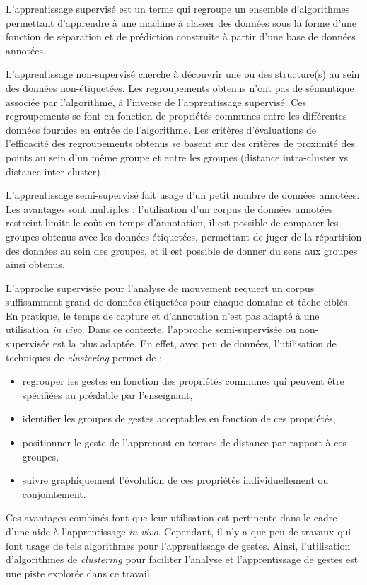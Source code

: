 L'apprentissage supervisé est un terme qui regroupe un ensemble d'algorithmes permettant d'apprendre à une machine à classer des données sous la forme d'une fonction de séparation et de prédiction construite à partir d'une base de données annotées.

L'apprentissage non-supervisé cherche à découvrir une ou des structure(s) au sein des données non-étiquetées. Les regroupements obtenus n'ont pas de sémantique associée par l'algorithme, à l'inverse de l'apprentissage supervisé. Ces regroupements se font en fonction de propriétés communes entre les différentes données fournies en entrée de l'algorithme. Les critères d'évaluations de l'efficacité des regroupements obtenus se basent sur des critères de proximité des points au sein d'un même groupe et entre les groupes (distance intra-cluster vs distance inter-cluster) \parencite{Kassab2008Fbc}.

L'apprentissage semi-supervisé fait usage d'un petit nombre de données annotées. Les avantages sont multiples : l'utilisation d'un corpus de données annotées restreint limite le coût en temps d'annotation, il est possible de comparer les groupes obtenus avec les données étiquetées, permettant de juger de la répartition des données au sein des groupes, et il est possible de donner du sens aux groupes ainsi obtenus.

L'approche supervisée pour l'analyse de mouvement requiert un corpus suffisamment grand de données étiquetées pour chaque domaine et tâche ciblés. En pratique, le temps de capture et d'annotation n'est pas adapté à une utilisation \textit{in vivo}. Dans ce contexte, l'approche semi-supervisée ou non-supervisée est la plus adaptée. En effet, avec peu de données, l'utilisation de techniques de \textit{clustering} permet de :

\begin{itemize}
	\item regrouper les gestes en fonction des propriétés communes qui peuvent être spécifiées au préalable par l'enseignant,
	\item identifier les groupes de gestes acceptables en fonction de ces propriétés,
	\item positionner le geste de l'apprenant en termes de distance par rapport à ces groupes,
	\item suivre graphiquement l'évolution de ces propriétés individuellement ou conjointement.
\end{itemize}

Ces avantages combinés font que leur utilisation est pertinente dans le cadre d'une aide à l'apprentissage \textit{in vivo}. Cependant, il n'y a que peu de travaux qui font usage de tels algorithmes pour l'apprentissage de gestes. Ainsi, l'utilisation d'algorithmes de \textit{clustering} pour faciliter l'analyse et l'apprentissage de gestes est une piste explorée dans ce travail.


